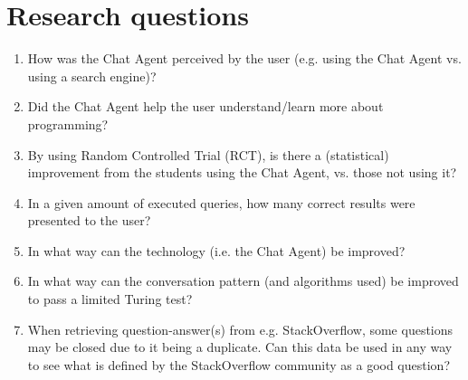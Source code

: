 \section{Research questions}
\label{chapter2:research_questions}
\begin{enumerate}
	\item \label{res_q1} How was the Chat Agent perceived by the user (e.g. using the Chat Agent vs. using a search engine)?
	\item \label{res_q2} Did the Chat Agent help the user understand/learn more about programming?
	\item \label{res_q3} By using Random Controlled Trial (RCT), is there a (statistical) improvement from the students using the Chat Agent, vs. those not using it?
	\item \label{res_q4} In a given amount of executed queries, how many correct results were presented to the user? 
	\item \label{res_q5} In what way can the technology (i.e. the Chat Agent) be improved? 
	\item \label{res_q6} In what way can the conversation pattern (and algorithms used) be improved to pass a limited Turing test?
	\item \label{res_q7} When retrieving question-answer(s) from e.g. StackOverflow, some questions may be closed due to it being a duplicate. 
	Can this data be used in any way to see what is defined by the StackOverflow community as a good question?
\end{enumerate}

